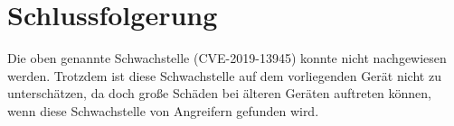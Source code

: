   



\section{Schlussfolgerung}

Die oben genannte Schwachstelle (CVE-2019-13945) konnte nicht nachgewiesen werden. Trotzdem ist diese Schwachstelle auf dem vorliegenden Gerät nicht zu unterschätzen, da doch große Schäden bei älteren Geräten auftreten können, wenn diese Schwachstelle von Angreifern gefunden wird.










